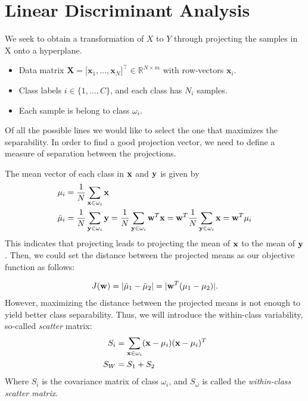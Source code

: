 \section{Linear Discriminant Analysis}

We seek to obtain a transformation of $X$ to $Y$ through projecting the samples in X onto a hyperplane.
\begin{itemize}
  \item Data matrix $\mathbf X=\bigl[\mathbf x_1,\dots,\mathbf x_N\bigr]^\top\in\mathbb R^{N\times m}$ with row‑vectors $\mathbf x_i$.
  \item Class labels $i\in\{1,\dots,C\}$, and each class has $N_i$ samples. 
  \item Each sample is belong to class $\omega_i$.
\end{itemize}
Of all the possible lines we would like to select the one that maximizes the separability. In order to find a good projection vector, we need to define a measure of separation between the projections.

The mean vector of each class in ${\mathbf{x}}$ and ${\mathbf{y}}$ is given by
\begin{align*}
	\mu_i &= \frac{1}{N}\sum_{{\mathbf{x}}\in \omega_i} {\mathbf{x}}\\
	\tilde{\mu}_i &= \frac{1}{N}\sum_{{\mathbf{y}}\in \omega_i} {\mathbf{y}} = \frac{1}{N}\sum_{{\mathbf{y}}\in \omega_i} {\mathbf{w}}^T{\mathbf{x}} = {\mathbf{w}}^T\frac{1}{N}\sum_{{\mathbf{y}}\in \omega_i} {\mathbf{x}} = {\mathbf{w}}^T\mu_i
\end{align*}
This indicates that projecting leads to projecting the mean of ${\mathbf{x}}$ to the mean of ${\mathbf{y}}$. Then, we could set the distance between the projected means as our objective function as follows:

\begin{align*}
	J({\mathbf{w}}) = |\tilde{\mu}_1 - \tilde{\mu}_2| = |{\mathbf{w}}^T(\mu_1 - \mu_2)|.
\end{align*}
However, maximizing the distance between the projected means is not enough to yield better class separability. Thus, we will introduce the within-class variability, so-called \textit{scatter} matrix:
\begin{align*}
	S_i &= \sum_{{\mathbf{x}}\in \omega_i} ({\mathbf{x}}-\mu_i)({\mathbf{x}}-\mu_i)^T\\
	S_W &= S_1+S_2
\end{align*}
Where $S_i$ is the covariance matrix of class $\omega_i$, and $S_\omega$ is called the \textit{within-class scatter matrix}.

